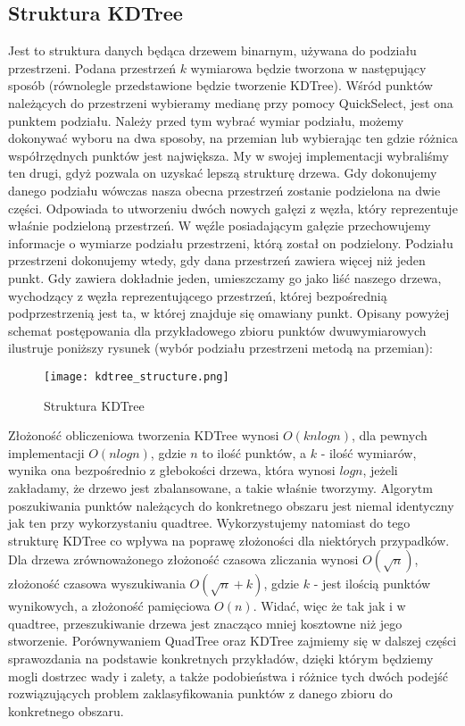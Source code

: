 \documentclass[a4paper, 12pt]{article}
\begin{document}
    \subsection{Struktura KDTree}
      \quad Jest to struktura danych będąca drzewem binarnym, używana do podziału przestrzeni. Podana przestrzeń $k$ wymiarowa będzie tworzona w następujący sposób (równolegle przedstawione będzie tworzenie KDTree). Wśród punktów należących do przestrzeni wybieramy medianę przy pomocy QuickSelect, jest ona punktem podziału. Należy przed tym wybrać wymiar podziału, możemy dokonywać wyboru na dwa sposoby, na przemian lub wybierając ten gdzie różnica współrzędnych punktów jest największa. My w swojej implementacji wybraliśmy ten drugi, gdyż pozwala on uzyskać lepszą strukturę drzewa. Gdy dokonujemy danego podziału wówczas nasza obecna przestrzeń zostanie podzielona na dwie części. Odpowiada to utworzeniu dwóch nowych gałęzi z węzła, który reprezentuje właśnie podzieloną przestrzeń. W węźle posiadającym gałęzie przechowujemy informacje o wymiarze podziału przestrzeni, którą został on podzielony.  Podziału przestrzeni dokonujemy wtedy, gdy dana przestrzeń zawiera więcej niż jeden punkt. Gdy zawiera dokładnie jeden, umieszczamy go jako liść naszego drzewa, wychodzący z węzła reprezentującego przestrzeń, której bezpośrednią podprzestrzenią jest ta, w której znajduje się omawiany punkt. Opisany powyżej schemat postępowania dla przykładowego zbioru punktów dwuwymiarowych ilustruje poniższy rysunek (wybór podziału przestrzeni metodą na przemian): 

      \newpage
      \begin{figure}[h!]
      \centering
        \texttt{[image: kdtree\_structure.png]}
        \caption{Struktura KDTree}
      \end{figure}

      \noindent
      \quad Złożoność obliczeniowa tworzenia KDTree wynosi $O(knlogn)$, dla pewnych implementacji $O(nlogn)$, gdzie $n$ to ilość punktów, a $k$ - ilość wymiarów, wynika ona bezpośrednio z głebokości drzewa, która wynosi $logn$, jeżeli zakładamy, że drzewo jest zbalansowane, a takie właśnie tworzymy.  Algorytm poszukiwania punktów należących do konkretnego obszaru jest niemal identyczny jak ten przy wykorzystaniu quadtree. Wykorzystujemy natomiast do tego strukturę KDTree co wpływa na poprawę złożoności dla niektórych przypadków. Dla drzewa zrównoważonego złożoność czasowa zliczania wynosi $O(\sqrt{n})$, złożoność czasowa wyszukiwania $O(\sqrt{n} + k)$, gdzie $k$ - jest ilością punktów wynikowych, a złożoność pamięciowa $O(n)$. Widać, więc że tak jak i w quadtree, przeszukiwanie drzewa jest znacząco mniej kosztowne niż jego stworzenie. Porównywaniem QuadTree oraz KDTree zajmiemy się w dalszej części sprawozdania na podstawie konkretnych przykładów, dzięki którym będziemy mogli dostrzec wady i zalety, a także podobieństwa i różnice tych dwóch podejść rozwiązujących problem zaklasyfikowania punktów z danego zbioru do konkretnego obszaru.
\end{document}
